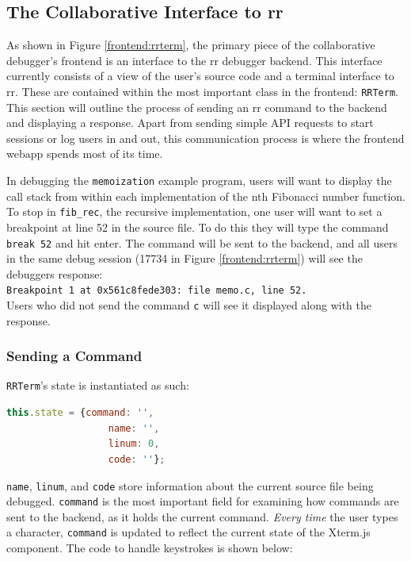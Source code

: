 \documentclass[12pt]{article}
\begin{document}
\subsection{The Collaborative Interface to rr}

As shown in Figure \ref{frontend:rrterm}, the primary piece of the
collaborative debugger's frontend is an interface to the rr debugger
backend.  This interface currently consists of a view of the user's
source code and a terminal interface to rr.  These are contained
within the most important class in the frontend: \lstinline{RRTerm}.
This section will outline the process of sending an rr command to the
backend and displaying a response.  Apart from sending simple API
requests to start sessions or log users in and out, this communication
process is where the frontend webapp spends most of its time.
\par

In debugging the \lstinline{memoization} example program, users will
want to display the call stack from within each implementation of the
nth Fibonacci number function.  To stop in \lstinline{fib_rec}, the
recursive implementation, one user will want to set a breakpoint at
line 52 in the source file.  To do this they will type the command
\lstinline{break 52} and hit enter.  The command will be sent to the
backend, and all users in the same debug session (17734 in Figure
\ref{frontend:rrterm}) will see the debuggers response:\\
\lstinline{Breakpoint 1 at 0x561c8fede303: file memo.c, line 52.}\\
Users who did not send the command \lstinline{c} will see it displayed
along with the response.

\subsubsection{Sending a Command}

\lstinline{RRTerm}'s state is instantiated as such:

\begin{lstlisting}[language=Javascript,basicstyle=\linespread{0.5}\ttfamily,caption={RRTerm's State},captionpos=b]
  this.state = {command: '',
                  name: '',
                  linum: 0,
                  code: ''};
\end{lstlisting}

\lstinline{name}, \lstinline{linum}, and \lstinline{code} store
information about the current source file being debugged.
\lstinline{command} is the most important field for examining how
commands are sent to the backend, as it holds the current command.
\textit{Every time} the user types a character, \lstinline{command} is
updated to reflect the current state of the Xterm.js component.  The
code to handle keystrokes is shown below:
\end{document}
